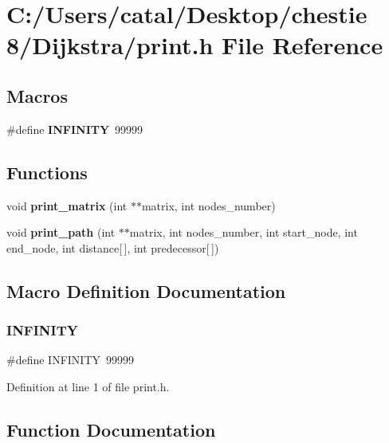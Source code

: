 \section{C\+:/\+Users/catal/\+Desktop/chestie 8/\+Dijkstra/print.h File Reference}
\label{print_8h}
\subsection*{Macros}
\begin{DoxyCompactItemize}
\item 
\#define \textbf{ I\+N\+F\+I\+N\+I\+TY}~99999
\end{DoxyCompactItemize}
\subsection*{Functions}
\begin{DoxyCompactItemize}
\item 
void \textbf{ print\+\_\+matrix} (int $\ast$$\ast$matrix, int nodes\+\_\+number)
\item 
void \textbf{ print\+\_\+path} (int $\ast$$\ast$matrix, int nodes\+\_\+number, int start\+\_\+node, int end\+\_\+node, int distance[$\,$], int predecessor[$\,$])
\end{DoxyCompactItemize}


\subsection{Macro Definition Documentation}
\mbox{\label{print_8h_a956e2723d559858d08644ac99146e910}} 
\subsubsection{I\+N\+F\+I\+N\+I\+TY}
{\footnotesize\ttfamily \#define I\+N\+F\+I\+N\+I\+TY~99999}



Definition at line 1 of file print.\+h.



\subsection{Function Documentation}
\mbox{\label{print_8h_a921b41cb0b745c5a64f4987a06648ac2}} 
